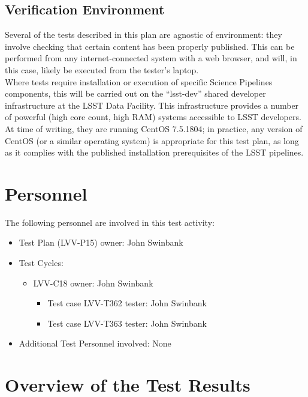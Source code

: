 \documentclass[DM,lsstdraft,STR,toc]{lsstdoc}
\begin{document}
\subsection{Verification Environment}
\label{sect:hwconf}
  Several of the tests described in this plan are agnostic of environment:
they involve checking that certain content has been properly published.
This can be performed from any internet-connected system with a web
browser, and will, in this case, likely be executed from the tester's
laptop.\\[2\baselineskip]Where tests require installation or execution
of specific Science Pipelines components, this will be carried out on
the ``lsst-dev'' shared developer infrastructure at the LSST Data
Facility. This infrastructure provides a number of powerful (high core
count, high RAM) systems accessible to LSST developers. At time of
writing, they are running CentOS 7.5.1804; in practice, any version of
CentOS (or a similar operating system) is appropriate for this test
plan, as long as it complies with the published installation
prerequisites of the LSST pipelines.\\[2\baselineskip]





\section{Personnel}
\label{sect:personnel}

The following personnel are involved in this test activity:

\begin{itemize}
\item Test Plan (LVV-P15) owner: John Swinbank
\item Test Cycles:
\begin{itemize}
  \item LVV-C18 owner: 
    John Swinbank
  \begin{itemize}
    \item Test case LVV-T362 tester: John Swinbank
    \item Test case LVV-T363 tester: John Swinbank
  \end{itemize}
\end{itemize}
\item Additional Test Personnel involved: None
\end{itemize}

\newpage

\section{Overview of the Test Results}
\label{sect:overview}
\end{document}
